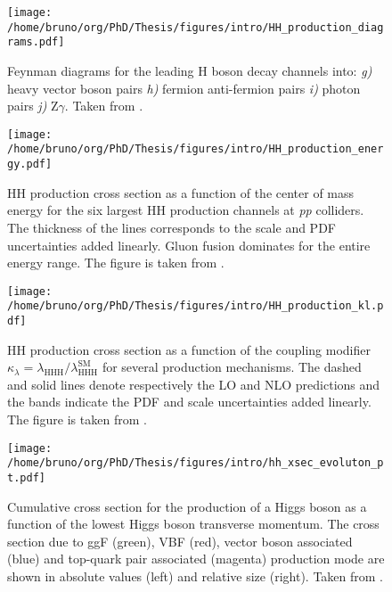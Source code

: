 \documentclass[11pt]{article}
\newcommand{\klrat}{\kappa_{\lambda} = \lambda_{\text{HHH}} / \lambda_{\text{HHH}}^{\text{SM}}}
\begin{document}
\begin{figure}[htbp]
\centering
\texttt{[image: /home/bruno/org/PhD/Thesis/figures/intro/HH\_production\_diagrams.pdf]}
\caption{\label{fig:HH_production_diagrams_b}Feynman diagrams for the leading H boson decay channels into: \emph{g)} heavy vector boson pairs \emph{h)} fermion anti-fermion pairs \emph{i)} photon pairs \emph{j)} Z\(\gamma\). Taken from \cite{higgs_10_years}.}
\end{figure}

\begin{figure}[htbp]
\centering
\texttt{[image: /home/bruno/org/PhD/Thesis/figures/intro/HH\_production\_energy.pdf]}
\caption{\label{fig:HH_prod_energy}HH production cross section as a function of the center of mass energy for the six largest HH production channels at \emph{pp} colliders. The thickness of the lines corresponds to the scale and PDF uncertainties added linearly. Gluon fusion dominates for the entire energy range. The figure is taken from \cite{HH_xsec_running}.}
\end{figure}

\begin{figure}[htbp]
\centering
\texttt{[image: /home/bruno/org/PhD/Thesis/figures/intro/HH\_production\_kl.pdf]}
\caption{\label{fig:HH_prod_kl}HH production cross section as a function of the coupling modifier \(\klrat\) for several production mechanisms. The dashed and solid lines denote respectively the LO and NLO predictions and the bands indicate the PDF and scale uncertainties added linearly. The figure is taken from \cite{HH_xsec_running}.}
\end{figure}

\begin{figure}[htbp]
\centering
\texttt{[image: /home/bruno/org/PhD/Thesis/figures/intro/hh\_xsec\_evoluton\_pt.pdf]}
\caption{\label{fig:HH_prod_kl_b}Cumulative cross section for the production of a Higgs boson as a function of the lowest Higgs boson transverse momentum. The cross section due to \ac{ggF} (green), \ac{VBF} (red), vector boson associated (blue) and top-quark pair associated (magenta) production mode are shown in absolute values (left) and relative size (right). Taken from \cite{xsec_evolution_pt}.}
\end{figure}
\end{document}
